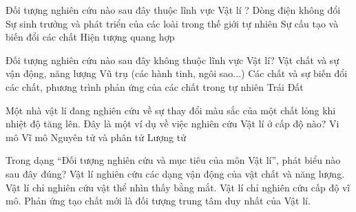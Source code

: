 \begin{ex}
Đối tượng nghiên cứu nào sau đây thuộc lĩnh vực Vật lí ?
\choice
{\True Dòng điện không đổi}
{Sự sinh trưởng và phát triển của các loài trong thế giới tự nhiên}
{Sự cấu tạo và biến đổi các chất}
{Hiện tượng quang hợp}
\end{ex}

\begin{ex}
Đối tượng nghiên cứu nào sau đây không thuộc lĩnh vực Vật lí?
\choice
{Vật chất và sự vận động, năng lượng}
{Vũ trụ (các hành tinh, ngôi sao...)}
{\True Các chất và sự biến đổi các chất, phương trình phản ứng của các chất trong tự nhiên}
{Trái Đất}
\end{ex}

\begin{ex}
Một nhà vật lí đang nghiên cứu về sự thay đổi màu sắc của một chất lỏng khi nhiệt độ tăng lên. Đây là một ví dụ về việc nghiên cứu Vật lí ở cấp độ nào?
\choice
{\True Vi mô}
{Vĩ mô}
{Nguyên tử và phân tử}
{Lượng tử}
\end{ex}

\begin{ex}
Trong dạng “Đối tượng nghiên cứu và mục tiêu của môn Vật lí”, phát biểu nào sau đây đúng?
\choice
{\True Vật lí nghiên cứu các dạng vận động của vật chất và năng lượng.}
{Vật lí chỉ nghiên cứu vật thể nhìn thấy bằng mắt.}
{Vật lí chỉ nghiên cứu cấp độ vĩ mô.}
{Phản ứng tạo chất mới là đối tượng trung tâm duy nhất của Vật lí.}
\end{ex}


